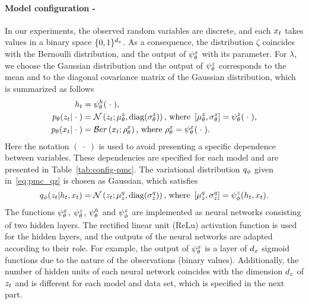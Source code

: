 \paragraph{Model configuration -}
In our experiments, the observed random variables are discrete,
and each $x_t$ takes values in a binary space $\{0,1\}^{d_{x}}$.
As a consequence, the distribution $\zeta$ coincides with the
Bernoulli distribution, and the output of $\psi^{x}_{\theta}$ with its parameter.
For $\lambda$, we choose the Gaussian distribution and 
the output of $\psi^{z}_{\theta}$ corresponds to the mean and to the diagonal covariance matrix of 
the Gaussian distribution, which is summarized as follows
\begin{equation*}
    \begin{aligned}
    h_t &= \psi^{h}_{\theta}(\; \cdot \;) \text{,} \\
    p_{\theta}(z_t|\; \cdot \;)  &= {\mathcal N}\left(z_t;  \mu_{\theta}^{z} , \mathrm{diag}(\sigma_{\theta}^{z}) \right)   \text{, where }   \left[ \mu_{\theta}^{z} , \sigma_{\theta}^{z} \right]= \psi^{z}_{\theta}(\; \cdot \;) \text{,} \\
    p_{\theta}(x_t|\; \cdot \;)&= {\mathcal Ber}\left(x_t; \rho_{\theta}^{x} \right) 
    \text{, where } \rho_{\theta}^{x}  = \psi^{x}_{\theta}(\; \cdot \;) \text{.}
    \end{aligned}
\end{equation*}
Here the notation $( \; \cdot \;)$ is used to avoid presenting a specific dependence between variables. 
These dependencies are specified for each model and are presented in 
Table~\ref{tab:config-pmc}.
The variational distribution $q_\phi$ given in~\eqref{eq:pmc_qz}
is chosen as Gaussian, which satisfies
\begin{equation*}
    q_\phi(z_t|h_{t}, x_{t})  =
    \mathcal{N}\left(z_t; \mu_{z}^{q}, \mathrm{diag}(\sigma_{z}^{q}) \right) \text{, where } 
    \left[ \mu_{z}^{q}, \sigma_{z}^{q} \right] = \psi^{z}_{\phi}(h_{t},x_t) \text{.}
\end{equation*}
The functions   $\psi^{x}_{\theta}$, $\psi^{z}_{\theta}$, $\psi^{h}_{\theta}$ and $\psi^{z}_{\phi}$ are implemented as
neural networks consisting of two hidden layers.
The rectified linear unit (ReLu) activation function is used for the hidden layers,
and the outputs of the neural networks are adapted according to their role. 
For example, the output of $\psi^{x}_{\theta}$ is a layer of $d_x$ sigmoid functions 
due to the nature of the observations (binary values).
Additionally, the number of hidden units of each neural network coincides with the dimension $d_z$ 
of $z_t$ and is different for each model and data set, which is specified in the next part.



